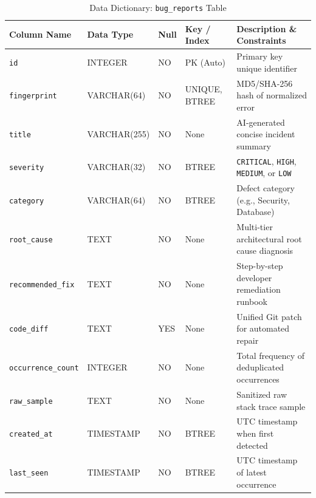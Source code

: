 \documentclass[12pt,a4paper]{article}
\begin{document}
\begin{table}[H]
\centering
\caption{Data Dictionary: \texttt{bug\_reports} Table}
\label{tab:dd_bug_reports}
\renewcommand{\arraystretch}{1.25}
\begin{tabularx}{\textwidth}{|>{\raggedright\arraybackslash}p{3.2cm}|>{\raggedright\arraybackslash}p{2.6cm}|>{\centering\arraybackslash}p{1.4cm}|>{\raggedright\arraybackslash}p{2.2cm}|>{\raggedright\arraybackslash}X|}
\hline
\textbf{Column Name} & \textbf{Data Type} & \textbf{Null} & \textbf{Key / Index} & \textbf{Description \& Constraints} \\
\hline
\texttt{id} & INTEGER & NO & PK (Auto) & Primary key unique identifier \\
\hline
\texttt{fingerprint} & VARCHAR(64) & NO & UNIQUE, BTREE & MD5/SHA-256 hash of normalized error \\
\hline
\texttt{title} & VARCHAR(255) & NO & None & AI-generated concise incident summary \\
\hline
\texttt{severity} & VARCHAR(32) & NO & BTREE & \texttt{CRITICAL}, \texttt{HIGH}, \texttt{MEDIUM}, or \texttt{LOW} \\
\hline
\texttt{category} & VARCHAR(64) & NO & BTREE & Defect category (e.g., Security, Database) \\
\hline
\texttt{root\_cause} & TEXT & NO & None & Multi-tier architectural root cause diagnosis \\
\hline
\texttt{recommended\_fix} & TEXT & NO & None & Step-by-step developer remediation runbook \\
\hline
\texttt{code\_diff} & TEXT & YES & None & Unified Git patch for automated repair \\
\hline
\texttt{occurrence\_count} & INTEGER & NO & None & Total frequency of deduplicated occurrences \\
\hline
\texttt{raw\_sample} & TEXT & NO & None & Sanitized raw stack trace sample \\
\hline
\texttt{created\_at} & TIMESTAMP & NO & BTREE & UTC timestamp when first detected \\
\hline
\texttt{last\_seen} & TIMESTAMP & NO & BTREE & UTC timestamp of latest occurrence \\
\hline
\end{tabularx}
\end{table}
\end{document}
